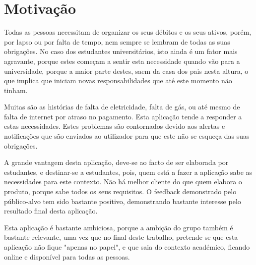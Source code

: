 \chapter[Motivação]
{Motiva\c{c}\~ao}

Todas as pessoas necessitam de organizar os seus débitos e os seus ativos, porém, por lapso ou por falta de tempo, nem sempre se lembram de todas as suas obrigações. No caso dos estudantes universitários, isto ainda é um fator mais agravante, porque estes começam a sentir esta necessidade quando vão para a universidade, porque a maior parte destes, saem da casa dos pais nesta altura, o que implica que iniciam novas responsabilidades que até este momento não tinham.

Muitas são as histórias de falta de eletricidade, falta de gás, ou até mesmo de falta de internet por atraso no pagamento. Esta aplicação tende a responder a estas necessidades. Estes problemas são contornados devido aos alertas e notificações que são enviados ao utilizador para que este não se esqueça das suas obrigações.

A grande vantagem desta aplicação, deve-se ao facto de ser elaborada por estudantes, e destinar-se a estudantes, pois, quem está a fazer a aplicação sabe as necessidades para este contexto. Não há melhor cliente do que quem elabora o produto, porque sabe todos os seus requisitos. O feedback demonstrado pelo público-alvo tem sido bastante positivo, demonstrando bastante interesse pelo resultado final desta aplicação.

Esta aplicação é bastante ambiciosa, porque a ambição do grupo também é bastante relevante, uma vez que no final deste trabalho, pretende-se que esta aplicação não fique "apenas no papel", e que saia do contexto académico, ficando online e disponível para todas as pessoas.
